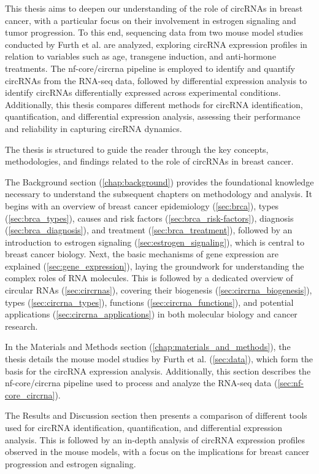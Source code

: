 This thesis aims to deepen our understanding of the role of circRNAs in breast
cancer, with a particular focus on their involvement in estrogen signaling and
tumor progression.
To this end, sequencing data from two mouse model studies conducted by Furth et
al.
\supercite{furth_esr1_2023,furth_overexpression_2023}
are analyzed, exploring circRNA expression profiles in relation to variables
such as age, transgene induction, and anti-hormone treatments.
The nf-core/circrna pipeline\supercite{digby_nf-corecircrna_2023} is employed
to identify and quantify circRNAs from the RNA-seq data, followed by
differential expression analysis to identify circRNAs differentially expressed
across experimental conditions.
Additionally, this thesis compares different methods for circRNA
identification, quantification, and differential expression analysis, assessing
their performance and reliability in capturing circRNA dynamics.

\medskip
\noindent The thesis is structured to guide the reader through the key
concepts,
methodologies, and findings related to the role of circRNAs in breast cancer.

The Background section (\cref{chap:background}) provides the foundational
knowledge necessary to understand the subsequent chapters on methodology and
analysis.
It begins with an overview of breast cancer epidemiology (\cref{sec:brca}),
types (\cref{sec:brca_types}), causes and risk factors
(\cref{sec:brca_risk-factors}), diagnosis (\cref{sec:brca_diagnosis}), and
treatment (\cref{sec:brca_treatment}), followed by an introduction to estrogen
signaling (\cref{sec:estrogen_signaling}), which is central to breast cancer
biology.
Next, the basic mechanisms of gene expression are explained
(\cref{sec:gene_expression}), laying the groundwork for understanding the
complex roles of RNA molecules.
This is followed by a dedicated overview of circular RNAs
(\cref{sec:circrnas}), covering their biogenesis
(\cref{sec:circrna_biogenesis}), types (\cref{sec:circrna_types}), functions
(\cref{sec:circrna_functions}), and potential applications
(\cref{sec:circrna_applications}) in both molecular biology and cancer
research.

In the Materials and Methods section (\cref{chap:materials_and_methods}), the
thesis details the mouse model studies by Furth et al.
\supercite{furth_esr1_2023,furth_overexpression_2023} (\cref{sec:data}),
which form the basis for the circRNA expression
analysis.
Additionally, this section describes the nf-core/circrna
pipeline\supercite{digby_nf-corecircrna_2023} used to process and analyze the
RNA-seq data (\cref{sec:nf-core_circrna}).

The Results and Discussion section then presents a comparison of different
tools used for circRNA identification, quantification, and differential
expression analysis.
This is followed by an in-depth analysis of circRNA expression profiles
observed in the mouse models, with a focus on the implications for breast
cancer progression and estrogen signaling.
